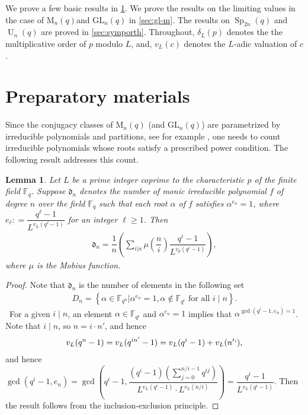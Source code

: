 \documentclass[11pt,twoside]{amsart}
\newcommand{\GL}{\mathrm{GL}}
\newcommand{\M}{\mathrm{M}}
\newcommand{\F}{\mathbb{F}}
\renewcommand{\d}{\mathfrak d}
\newcommand{\Sp}{\operatorname{Sp}}
\newcommand{\Un}{\operatorname{U}}
\newtheorem{lemma}{Lemma}[section]
\theoremstyle{definition} %
\begin{document}
We prove a few basic results in \cref{sec:prep}. We prove the results on the limiting values in the case of $\M_n(q)$and $\GL_n(q)$ in \cref{sec:gl-m}. The results on $\Sp_{2n}(q)$ and $\Un_n(q)$ are proved in \cref{sec:symporth}.
Throughout,
$\delta_L(p)$ denotes the the multiplicative order of $p$ modulo $L$, and,
$v_L(c)$ denotes the $L$-adic valuation of $c$.


\section{Preparatory materials}\label{sec:prep}
Since the conjugacy classes of $\M_n(q)$ (and $\GL_n(q)$) are parametrized by irreducible polynomials and partitions, see for example \cite{Macdonald81}, one needs to count irreducible polynomials whose roots satisfy a prescribed power condition.
The following result addresses this count.
\begin{lemma}\label{lem:count}
Let $L$ be a prime integer coprime to the characteristic $p$ of the finite field $\F_q$.
Suppose $\d_n$ denotes the number of monic irreducible polynomial $f$ of degree $n$ over the field $\F_q$ such that each root $\alpha$ of $f$ satisfies $\alpha^{e_{n}}=1$, where $e_{\ell}\colon = \dfrac{q^\ell-1}{L^{v_L(q^\ell-1)}}$ for an integer $\ell\geq 1$.
Then
\begin{align*}
    \d_n=\dfrac{1}{n}\left(\sum\limits_{i|n}\mu\left(\dfrac{n}{i}\right)\dfrac{q^i-1}{L^{v_p(q^i-1)}}\right),
\end{align*}
where $\mu$ is the Mobius function.
\end{lemma}
\begin{proof}
    Note that $\d_n$ is the number of elements in the following set
    \begin{align*}
        D_n=\left\{\alpha\in\mathbb F_{q^n}|\alpha^{e_n}=1,\alpha\not\in\mathbb F_{q^i}\text{ for all }i\mid n\right\}.
    \end{align*}\
    For a given $i\mid n$, an element $\alpha\in\mathbb F_{q^i}$ and $\alpha^{e_n}=1$ implies that $\alpha^{\gcd(q^i-1,e_n)=1}$.
    Note that $i\mid n$, so $n=i\cdot n'$, and hence
    \begin{align*}
        v_L(q^n-1)=v_L(q^{in'}-1)=v_L(q^i-1)+v_L(n'`),
    \end{align*}
    and hence $\gcd(q^i-1,e_n)=\gcd\left(q^i-1,\dfrac{(q^i-1)(\sum _{j=0}^{n/i-1} q^{ij})}{L^{v_L(q^i-1)}\cdot L^{v_L(n/i)}}\right)=\dfrac{q^i-1}{L^{v_L(q^i-1)}}$. Then the result follows from the inclusion-exclusion principle.
\end{proof}
\end{document}
